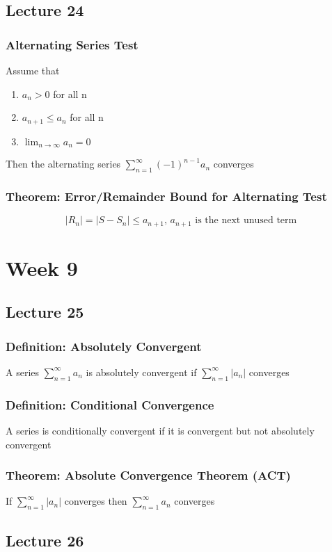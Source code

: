 \documentclass[12pt, letterpaper]{article}
\begin{document}
\subsection{Lecture 24}
\subsubsection{Alternating Series Test}
Assume that 
\begin{enumerate}
    \item $a_n>0$ for all n 
    \item $a_{n+1}\leq a_n$ for all n 
    \item $\displaystyle\lim_{n\to\infty}a_n = 0$
\end{enumerate}
Then the alternating series $\displaystyle\sum_{n=1}^{\infty}(-1)^{n-1}a_n$ converges
\subsubsection{Theorem: Error/Remainder Bound for Alternating Test}
\[|R_n| = |S - S_n| \leq a_{n+1} \text{, $a_{n+1}$ is the next unused term}\]

\section{Week 9}
\subsection{Lecture 25}
\subsubsection{Definition: Absolutely Convergent}
A series $\displaystyle\sum_{n=1}^{\infty}a_n$ is absolutely convergent if $\displaystyle\sum_{n=1}^{\infty}|a_n|$ converges
\subsubsection{Definition: Conditional Convergence}
A series is conditionally convergent if it is convergent but not absolutely convergent 
\subsubsection{Theorem: Absolute Convergence Theorem (ACT)}
If $\displaystyle\sum_{n=1}^{\infty}|a_n|$ converges then $\displaystyle\sum_{n=1}^{\infty}a_n$ converges 
\subsection{Lecture 26}
\end{document}
